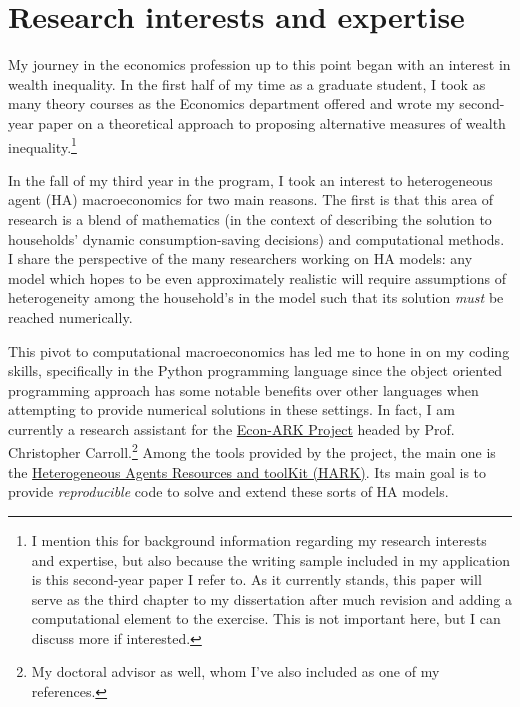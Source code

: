 \documentclass{scrartcl}
\begin{document}
%  

\section{Research interests and expertise}

My journey in the economics profession up to this point began with an interest in wealth inequality. In the first half of my time as a graduate student, I took as many theory courses as the Economics department offered and wrote my second-year paper on a theoretical approach to proposing alternative measures of wealth inequality.\footnote{I mention this for background information regarding my research interests and expertise, but also because the writing sample included in my application is this second-year paper I refer to. As it currently stands, this paper will serve as the third chapter to my dissertation after much revision and adding a computational element to the exercise. This is not important here, but I can discuss more if interested.}

In the fall of my third year in the program, I took an interest to heterogeneous agent (HA) macroeconomics for two main reasons. The first is that this area of research is a blend of mathematics (in the context of describing the solution to households' dynamic consumption-saving decisions) and computational methods. I share the perspective of the many researchers working on HA models: any model which hopes to be even approximately realistic will require assumptions of heterogeneity among the household's in the model such that its solution \textit{must} be reached numerically.

This pivot to computational macroeconomics has led me to hone in on my coding skills, specifically in the Python programming language since the object oriented programming approach has some notable benefits over other languages when attempting to provide numerical solutions in these settings. In fact, I am currently a research assistant for the \href{https://econ-ark.org}{Econ-ARK Project} headed by Prof. Christopher Carroll.\footnote{My doctoral advisor as well, whom I've also included as one of my references.} Among the tools provided by the project, the main one is the \href{https://econ-ark.org/toolkit}{Heterogeneous Agents Resources and toolKit (HARK)}. Its main goal is to provide \textit{reproducible} code to solve and extend these sorts of HA models. 
\end{document}
